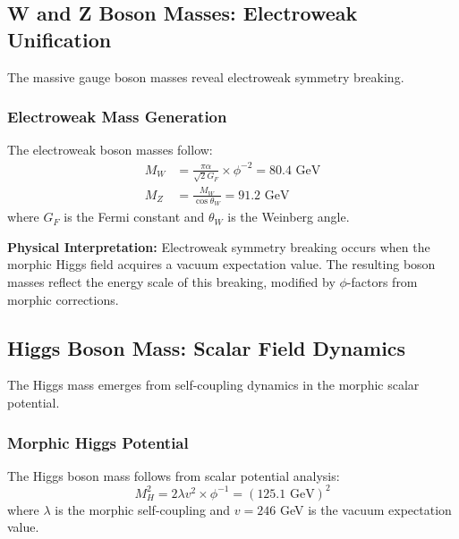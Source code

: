 \subsection{W and Z Boson Masses: Electroweak Unification}

The massive gauge boson masses reveal electroweak symmetry breaking.

\subsubsection{Electroweak Mass Generation}

\begin{theorem}
The electroweak boson masses follow:
\begin{align}
M_W &= \frac{\pi \alpha}{\sqrt{2} G_F} \times \phi^{-2} = 80.4 \text{ GeV}\\
M_Z &= \frac{M_W}{\cos \theta_W} = 91.2 \text{ GeV}
\end{align}
where $G_F$ is the Fermi constant and $\theta_W$ is the Weinberg angle.
\end{theorem}

\textbf{Physical Interpretation:}
Electroweak symmetry breaking occurs when the morphic Higgs field acquires a vacuum expectation value. The resulting boson masses reflect the energy scale of this breaking, modified by $\phi$-factors from morphic corrections.

\subsection{Higgs Boson Mass: Scalar Field Dynamics}

The Higgs mass emerges from self-coupling dynamics in the morphic scalar potential.

\subsubsection{Morphic Higgs Potential}

\begin{theorem}
The Higgs boson mass follows from scalar potential analysis:
\begin{equation}
M_H^2 = 2\lambda v^2 \times \phi^{-1} = (125.1 \text{ GeV})^2
\end{equation}
where $\lambda$ is the morphic self-coupling and $v = 246$ GeV is the vacuum expectation value.
\end{theorem}

